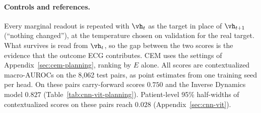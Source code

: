 \paragraph{Controls and references.} Every marginal readout is repeated with $\vh_t$ as the target in place of $\vh_{t+1}$ (``nothing changed''), at the temperature chosen on validation for the real target. What survives is read from $\vh_t$, so the gap between the two scores is the evidence that the outcome ECG contributes. CEM uses the settings of Appendix~\ref{sec:cem-planning}, ranking by $E$ alone. All scores are contextualized macro-AUROCs on the 8{,}062 test pairs, as point estimates from one training seed per head. On these pairs carry-forward scores $0.750$ and the Inverse Dynamics model $0.827$ (Table~\ref{tab:cnn-vit-planning}). Patient-level 95\% half-widths of contextualized scores on these pairs reach $0.028$ (Appendix~\ref{sec:cnn-vit}).


